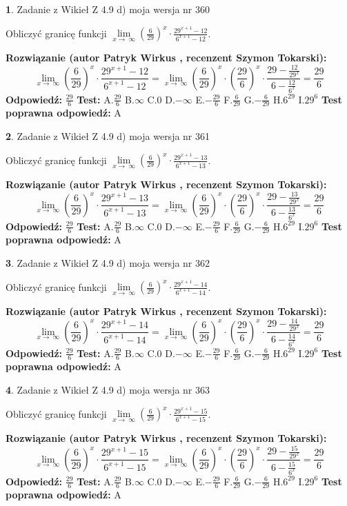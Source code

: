 \documentclass[12pt, a4paper]{article}
\theoremstyle{definition} %
\newtheorem{zad}{}
\newcommand{\zadStart}[1]{\begin{zad}#1\newline}
\newcommand{\zadStop}{\end{zad}}
\newcommand{\rozwStart}[2]{\noindent \textbf{Rozwiązanie (autor #1 , recenzent #2): }\newline}
\newcommand{\rozwStop}{\newline}
\newcommand{\odpStart}{\noindent \textbf{Odpowiedź:}\newline}
\newcommand{\odpStop}{\newline}
\newcommand{\testStart}{\noindent \textbf{Test:}\newline}
\newcommand{\testStop}{\newline}
\newcommand{\kluczStart}{\noindent \textbf{Test poprawna odpowiedź:}\newline}
\newcommand{\kluczStop}{\newline}
\begin{document}
\zadStart{Zadanie z Wikieł Z 4.9 d) moja wersja nr 360}


Obliczyć granicę funkcji  $\lim\limits_{x\to\ \infty}(\frac{6}{29})^{x}\cdot\frac{29^{x+1}-12}{6^{x+1}-12}$.
\zadStop
\rozwStart{Patryk Wirkus}{Szymon Tokarski}
$$\lim\limits_{x\to\ \infty}(\frac{6}{29})^{x}\cdot\frac{29^{x+1}-12}{6^{x+1}-12}=\lim\limits_{x\to\ \infty}(\frac{6}{29})^{x}\cdot(\frac{29}{6})^{x} \cdot \frac{29-\frac{12}{29^{x}}}{6-\frac{12}{6^{x}}} = \frac{29}{6}$$
\rozwStop
\odpStart
$\frac{29}{6}$
\odpStop
\testStart
A.$\frac{29}{6}$ B.$\infty$ C.$0$ D.$-\infty$ E.$-\frac{29}{6}$
F.$\frac{6}{29}$ G.$-\frac{6}{29}$
H.$6^{29}$
I.$29^{6}$
\testStop
\kluczStart
A
\kluczStop



\zadStart{Zadanie z Wikieł Z 4.9 d) moja wersja nr 361}


Obliczyć granicę funkcji  $\lim\limits_{x\to\ \infty}(\frac{6}{29})^{x}\cdot\frac{29^{x+1}-13}{6^{x+1}-13}$.
\zadStop
\rozwStart{Patryk Wirkus}{Szymon Tokarski}
$$\lim\limits_{x\to\ \infty}(\frac{6}{29})^{x}\cdot\frac{29^{x+1}-13}{6^{x+1}-13}=\lim\limits_{x\to\ \infty}(\frac{6}{29})^{x}\cdot(\frac{29}{6})^{x} \cdot \frac{29-\frac{13}{29^{x}}}{6-\frac{13}{6^{x}}} = \frac{29}{6}$$
\rozwStop
\odpStart
$\frac{29}{6}$
\odpStop
\testStart
A.$\frac{29}{6}$ B.$\infty$ C.$0$ D.$-\infty$ E.$-\frac{29}{6}$
F.$\frac{6}{29}$ G.$-\frac{6}{29}$
H.$6^{29}$
I.$29^{6}$
\testStop
\kluczStart
A
\kluczStop



\zadStart{Zadanie z Wikieł Z 4.9 d) moja wersja nr 362}


Obliczyć granicę funkcji  $\lim\limits_{x\to\ \infty}(\frac{6}{29})^{x}\cdot\frac{29^{x+1}-14}{6^{x+1}-14}$.
\zadStop
\rozwStart{Patryk Wirkus}{Szymon Tokarski}
$$\lim\limits_{x\to\ \infty}(\frac{6}{29})^{x}\cdot\frac{29^{x+1}-14}{6^{x+1}-14}=\lim\limits_{x\to\ \infty}(\frac{6}{29})^{x}\cdot(\frac{29}{6})^{x} \cdot \frac{29-\frac{14}{29^{x}}}{6-\frac{14}{6^{x}}} = \frac{29}{6}$$
\rozwStop
\odpStart
$\frac{29}{6}$
\odpStop
\testStart
A.$\frac{29}{6}$ B.$\infty$ C.$0$ D.$-\infty$ E.$-\frac{29}{6}$
F.$\frac{6}{29}$ G.$-\frac{6}{29}$
H.$6^{29}$
I.$29^{6}$
\testStop
\kluczStart
A
\kluczStop



\zadStart{Zadanie z Wikieł Z 4.9 d) moja wersja nr 363}


Obliczyć granicę funkcji  $\lim\limits_{x\to\ \infty}(\frac{6}{29})^{x}\cdot\frac{29^{x+1}-15}{6^{x+1}-15}$.
\zadStop
\rozwStart{Patryk Wirkus}{Szymon Tokarski}
$$\lim\limits_{x\to\ \infty}(\frac{6}{29})^{x}\cdot\frac{29^{x+1}-15}{6^{x+1}-15}=\lim\limits_{x\to\ \infty}(\frac{6}{29})^{x}\cdot(\frac{29}{6})^{x} \cdot \frac{29-\frac{15}{29^{x}}}{6-\frac{15}{6^{x}}} = \frac{29}{6}$$
\rozwStop
\odpStart
$\frac{29}{6}$
\odpStop
\testStart
A.$\frac{29}{6}$ B.$\infty$ C.$0$ D.$-\infty$ E.$-\frac{29}{6}$
F.$\frac{6}{29}$ G.$-\frac{6}{29}$
H.$6^{29}$
I.$29^{6}$
\testStop
\kluczStart
A
\kluczStop
\end{document}
